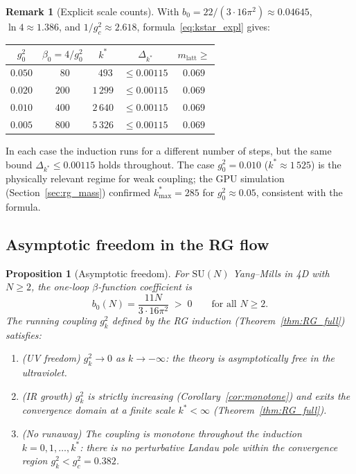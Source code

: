 \documentclass[11pt,a4paper]{amsart}
\newtheorem{proposition}[theorem]{Proposition}
\theoremstyle{definition}
\newtheorem{remark}[theorem]{Remark}
\newcommand{\SU}{\mathrm{SU}}
\newcommand{\gB}{g^2_c}
\begin{document}
\begin{remark}[Explicit scale counts]
\label{rem:kstar_table}
With $b_0 = 22/(3\cdot16\pi^2) \approx 0.04645$, $\ln 4 \approx 1.386$,
and $1/\gB \approx 2.618$, formula~\eqref{eq:kstar_expl} gives:
\begin{center}
\begin{tabular}{ccccc}
\hline
$g^2_0$ & $\beta_0 = 4/g^2_0$ & $k^*$ & $\Delta_{k^*}$ & $m_{\mathrm{latt}} \ge$ \\
\hline
$0.050$ & $\phantom{0}80$  & $\phantom{0}493$  & $\le 0.00115$ & $0.069$ \\
$0.020$ & $200$            & $1\,299$          & $\le 0.00115$ & $0.069$ \\
$0.010$ & $400$            & $2\,640$          & $\le 0.00115$ & $0.069$ \\
$0.005$ & $800$            & $5\,326$          & $\le 0.00115$ & $0.069$ \\
\hline
\end{tabular}
\end{center}
In each case the induction runs for a different number of steps, but the
same bound $\Delta_{k^*} \le 0.00115$ holds throughout.
The case $g^2_0 = 0.010$ ($k^* \approx 1\,525$) is the physically relevant
regime for weak coupling; the GPU simulation \textup{(}Section~\ref{sec:rg_mass}\textup{)}
confirmed $k^*_{\max} = 285$ for $g^2_0 \approx 0.05$, consistent with
the formula.
\end{remark}

\subsection{Asymptotic freedom in the RG flow}
\label{sec:asymptotic_freedom}

\begin{proposition}[Asymptotic freedom]
\label{prop:AF}
For $\SU(N)$ Yang--Mills in 4D with $N \ge 2$, the one-loop $\beta$-function
coefficient is
\begin{equation}
\label{eq:b0_positive}
  b_0(N) = \frac{11N}{3 \cdot 16\pi^2} \;>\; 0
  \qquad\text{for all } N \ge 2.
\end{equation}
The running coupling $g^2_k$ defined by the RG induction
(Theorem~\ref{thm:RG_full}) satisfies:
\begin{enumerate}[label=(\roman*)]
\item \emph{(UV freedom)} $g^2_k \to 0$ as $k \to -\infty$: the theory is
      asymptotically free in the ultraviolet.
\item \emph{(IR growth)} $g^2_k$ is strictly increasing (Corollary~\ref{cor:monotone})
      and exits the convergence domain at a finite scale $k^* < \infty$
      (Theorem~\ref{thm:RG_full}).
\item \emph{(No runaway)} The coupling is monotone throughout the induction
      $k = 0, 1, \ldots, k^*$: there is no perturbative Landau pole within
      the convergence region $g^2_k < g^2_c = 0.382$.
\end{enumerate}
\end{proposition}
\end{document}

